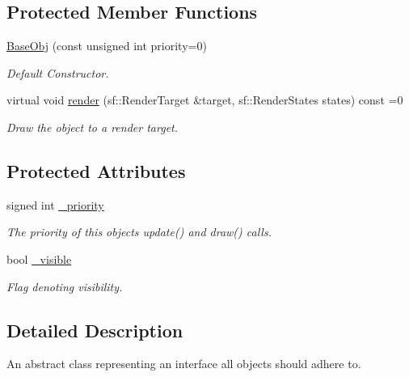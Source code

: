 \subsection*{Protected Member Functions}
\begin{DoxyCompactItemize}
\item 
\hyperlink{class_helios_1_1_base_obj_ad77bdec51d537c1bfc9661b728980498}{Base\+Obj} (const unsigned int priority=0)
\begin{DoxyCompactList}\small\item\em Default Constructor. \end{DoxyCompactList}\item 
virtual void \hyperlink{class_helios_1_1_base_obj_af7355477f06d38692dc6cdb6f99dbd11}{render} (sf\+::\+Render\+Target \&target, sf\+::\+Render\+States states) const  =0
\begin{DoxyCompactList}\small\item\em Draw the object to a render target. \end{DoxyCompactList}\end{DoxyCompactItemize}
\subsection*{Protected Attributes}
\begin{DoxyCompactItemize}
\item 
signed int \hyperlink{class_helios_1_1_base_obj_aad807d0a4296ffdfddf2e653b428481a}{\+\_\+priority}
\begin{DoxyCompactList}\small\item\em The priority of this object\textquotesingle{}s update() and draw() calls. \end{DoxyCompactList}\item 
bool \hyperlink{class_helios_1_1_base_obj_aed78a9a68c038e6d82e07711f9065e33}{\+\_\+visible}
\begin{DoxyCompactList}\small\item\em Flag denoting visibility. \end{DoxyCompactList}\end{DoxyCompactItemize}


\subsection{Detailed Description}
An abstract class representing an interface all objects should adhere to. 

